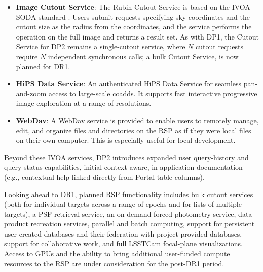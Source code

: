 \begin{itemize}
Users identify an image or observation of interest and query the service.
The result set includes \gls{metadata} about the image, such as the sky position, time, or band, and a data-access URL, which includes an IVOA Identifier uniquely identifying the dataset \citep[][]{DMTN-302}, allowing the dataset to be retrieved or a cutout requested via \gls{SODA} \citep[][]{2017ivoa.spec.0517B}.

\vspace{0.1cm}
\item \textbf{Image Cutout Service}: The Rubin Cutout Service \citep[][]{SQR-063, SQR-093} is based on the IVOA SODA standard \citep[][]{2017ivoa.spec.0517B}.
Users submit requests specifying sky coordinates and the cutout size as the radius from the coordinates, and the service performs the operation on the full image and returns a result set.
As with \gls{DP1}, the Cutout Service for \gls{DP2} remains a single-cutout service, where $N$ cutout requests require $N$ independent synchronous calls; a bulk Cutout Service, \citep[][]{DMTN-326} is now planned for \gls{DR1}.

\vspace{0.1cm}
\item \textbf{HiPS Data Service}: An authenticated \gls{HiPS} \citep[][]{2017ivoa.spec.0519F} Data Service for seamless pan-and-zoom access to large-scale coadds.
It supports fast interactive progressive image exploration at a range of resolutions.

\vspace{0.1cm}
\item \textbf{\gls{WebDav}}: A \gls{WebDav} service is provided to enable users to remotely manage, edit, and organize files and directories on the \gls{RSP} as if they were local files on their own computer.
This is especially useful for local development.
\end{itemize}

Beyond these \gls{IVOA} services, \gls{DP2} introduces expanded user query-history and query-status capabilities, initial context-aware, in-application documentation (e.g., contextual help linked directly from Portal table columns).

Looking ahead to \gls{DR1}, planned RSP functionality includes bulk cutout services (both for individual targets across a range of epochs and for lists of multiple targets), a \gls{PSF} retrieval service, an on-demand forced-photometry service, data product recreation services, parallel and batch computing, support for persistent user-created databases and their federation with project-provided databases, support for collaborative work, and full \gls{LSSTCam} focal-plane visualizations.
Access to GPUs and the ability to bring additional user-funded compute resources to the \gls{RSP} are under consideration for the post-\gls{DR1} period.

